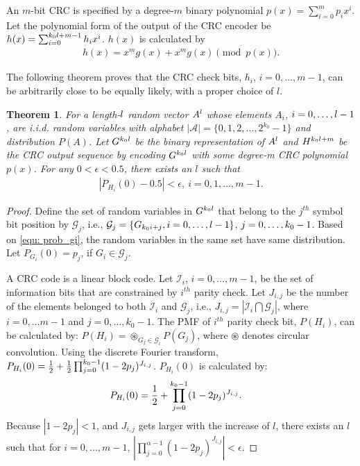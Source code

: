 \documentclass [PhD] {uclathes}
\newtheorem{theorem}{Theorem}
\begin{document}
An $m$-bit CRC is specified by a degree-$m$ binary polynomial $p(x)=\sum_{i=0}^mp_{i}x^i$. 
Let the polynomial form of the output of the CRC encoder be $h(x)=\sum_{i=0}^{k_0l+m-1}h_ix^i$. $h(x)$ is calculated by
\begin{align}\label{equ: CRC_encoding}
    h(x)=x^mg(x)+x^m g(x)\pmod{p(x)}.
\end{align}


The following theorem proves that the CRC check bits, $h_i$, $i=0,\ldots,m-1$, can be arbitrarily close to be  equally likely, with a proper choice of $l$.

\begin{theorem}\label{the: uniform_bits}
    For a length-$l$ random vector $A^l$ whose elements $A_i$, $i=0,\dots,l-1$, are i.i.d. random variables with alphabet $|\mathcal{A}|=\{0,1,2,\dots,2^{k_0}-1 \}$ and distribution $P(A)$. Let $G^{k_0 l}$ be the binary representation of $A^l$ and $H^{k_0l+m}$ be the CRC output sequence by encoding $G^{k_0l}$  with some degree-m CRC polynomial $p(x)$. For any $0<\epsilon<0.5$, there exists an $l$ such that
    \begin{align*}
        |P_{H_i}(0)-0.5|<\epsilon,~i=0,1,\dots,m-1.
    \end{align*}
\end{theorem}

\begin{proof}
Define the set of random variables in $G^{k_0 l}$ that belong to the $j^{th}$ symbol bit position by $\mathcal{G}_j$, i.e.,
$\mathcal{G}_j=\{G_{k_0 i+j},i=0,\ldots,l-1\}$,
$j=0,\dots,k_0-1$. Based on \eqref{equ: prob_gi}, the random variables in the same set have same distribution. Let $P_{G_i}(0)=p_j$, if $G_i\in\mathcal{G}_j$.


A CRC code is a linear block code. Let $\mathcal{I}_i$,  $i=0,\dots,m-1$,  be the set of information bits that are constrained by $i^{th}$ parity check.
Let $J_{i,j}$ be the number of the elements belonged to both $\mathcal{I}_i$ and $\mathcal{G}_j$, i.e., $J_{i,j}=\left|\mathcal{I}_i\bigcap \mathcal{G}_j \right|$, where $i=0,\dots m-1$ and $j=0,\dots, k_0-1$. The PMF of $i^{th}$ parity check bit, $P(H_i)$,  can be calculated by:
$P(H_i)=\circledast_{G_j\in\mathcal{G}_i}P(G_j)$, where $\circledast$ denotes circular convolution.
Using the discrete Fourier transform, $P_{H_i}(0) = \frac{1}{2}+\frac{1}{2}\prod_{j=0}^{k_0 -1}(1-2p_j)^{J_{i,j}}$.
$P_{H_i}(0)$ is calculated by:
\begin{align}
     P_{H_i}(0) &= \frac{1}{2}+\prod_{j=0}^{k_0 -1}(1-2p_j)^{J_{i,j}}.
\end{align}
Because $|1-2p_j|<1$, and $J_{i,j}$ gets larger with the increase of $l$, there exists an $l$ such that for $i=0,...,m-1$, $\left|\prod_{j=0}^{\alpha-1}(1-2p_j)^{J_{i,j}}\right|<\epsilon$.
\end{proof}
\end{document}
